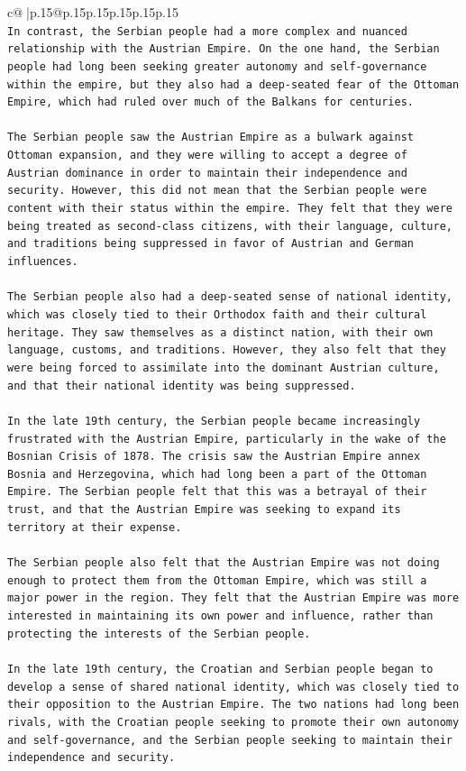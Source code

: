 \documentclass{article}
\begin{document}
{\begin{supertabular}{c@{$\;$}|p{.15\linewidth}@{}p{.15\linewidth}p{.15\linewidth}p{.15\linewidth}p{.15\linewidth}p{.15\linewidth}}
{{{\\ 
\texttt{In contrast, the Serbian people had a more complex and nuanced relationship with the Austrian Empire. On the one hand, the Serbian people had long been seeking greater autonomy and self{-}governance within the empire, but they also had a deep{-}seated fear of the Ottoman Empire, which had ruled over much of the Balkans for centuries.} \\
\\ 
\texttt{The Serbian people saw the Austrian Empire as a bulwark against Ottoman expansion, and they were willing to accept a degree of Austrian dominance in order to maintain their independence and security. However, this did not mean that the Serbian people were content with their status within the empire. They felt that they were being treated as second{-}class citizens, with their language, culture, and traditions being suppressed in favor of Austrian and German influences.} \\
\\ 
\texttt{The Serbian people also had a deep{-}seated sense of national identity, which was closely tied to their Orthodox faith and their cultural heritage. They saw themselves as a distinct nation, with their own language, customs, and traditions. However, they also felt that they were being forced to assimilate into the dominant Austrian culture, and that their national identity was being suppressed.} \\
\\ 
\texttt{In the late 19th century, the Serbian people became increasingly frustrated with the Austrian Empire, particularly in the wake of the Bosnian Crisis of 1878. The crisis saw the Austrian Empire annex Bosnia and Herzegovina, which had long been a part of the Ottoman Empire. The Serbian people felt that this was a betrayal of their trust, and that the Austrian Empire was seeking to expand its territory at their expense.} \\
\\ 
\texttt{The Serbian people also felt that the Austrian Empire was not doing enough to protect them from the Ottoman Empire, which was still a major power in the region. They felt that the Austrian Empire was more interested in maintaining its own power and influence, rather than protecting the interests of the Serbian people.} \\
\\ 
\texttt{In the late 19th century, the Croatian and Serbian people began to develop a sense of shared national identity, which was closely tied to their opposition to the Austrian Empire. The two nations had long been rivals, with the Croatian people seeking to promote their own autonomy and self{-}governance, and the Serbian people seeking to maintain their independence and security.} \\
}}}
\end{supertabular}}
\end{document}
